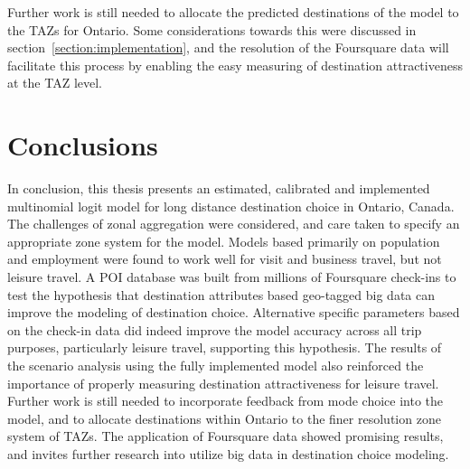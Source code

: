 Further work is still needed to allocate the predicted destinations of the model to the TAZs for Ontario. Some considerations towards this were discussed in section~\ref{section:implementation}, and the resolution of the Foursquare data will facilitate this process by enabling the easy measuring of destination attractiveness at the TAZ level.

\section{Conclusions}
In conclusion, this thesis presents an estimated, calibrated and implemented multinomial logit model for long distance destination choice in Ontario, Canada. The challenges of zonal aggregation were considered, and care taken to specify an appropriate zone system for the model. Models based primarily on population and employment were found to work well for visit and business travel, but not leisure travel. A POI database was built from millions of Foursquare check-ins to test the hypothesis that destination attributes based geo-tagged big data can improve the modeling of destination choice. Alternative specific parameters based on the check-in data did indeed improve the model accuracy across all trip purposes, particularly leisure travel, supporting this hypothesis. The results of the scenario analysis using the fully implemented model also reinforced the importance of properly measuring destination attractiveness for leisure travel. Further work is still needed to incorporate feedback from mode choice into the model, and to allocate destinations within Ontario to the finer resolution zone system of TAZs. The application of Foursquare data showed promising results, and invites further research into utilize big data in destination choice modeling.
